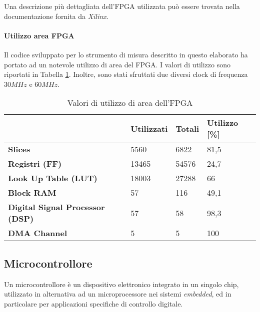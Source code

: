 Una descrizione più dettagliata dell'FPGA utilizzata può essere trovata nella documentazione fornita da \textit{Xilinx}\cite{dsxilinx}.

\paragraph{Utilizzo area FPGA}
Il codice sviluppato per lo strumento di misura descritto in questo elaborato ha portato ad un notevole utilizzo di area del FPGA. I valori di utilizzo sono riportati in Tabella \ref{tabarea}. Inoltre, sono stati sfruttati due diversi clock di frequenza $30MHz$ e $60MHz$.

\begin{table}[ht]
\centering
\begin{tabular}{l|l|l|l}
                                        & \textbf{Utilizzati} & \textbf{Totali} & \textbf{Utilizzo {[}\%{]}} \\ \hline
\textbf{Slices}                         & 5560                & 6822            & 81,5                                      \\
\textbf{Registri (FF)}                  & 13465               & 54576           & 24,7                                      \\
\textbf{Look Up Table (LUT)}            & 18003               & 27288           & 66                                        \\
\textbf{Block RAM}                      & 57                  & 116             & 49,1                                      \\
\textbf{Digital Signal Processor (DSP)} & 57                  & 58              & 98,3                                      \\
\textbf{DMA Channel}                    & 5                   & 5               & 100                                      
\end{tabular}
\caption{Valori di utilizzo di area dell'FPGA}
\label{tabarea}
\end{table}

\subsection{Microcontrollore}
Un microcontrollore è un dispositivo elettronico integrato in un singolo chip, utilizzato in alternativa ad un microprocessore nei sistemi \textit{embedded}, ed in particolare per applicazioni specifiche di controllo digitale.

